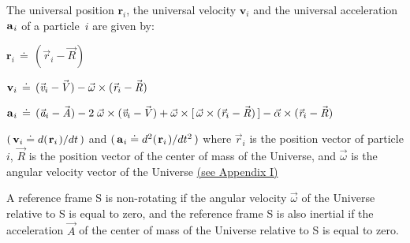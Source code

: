 \documentclass[10pt]{article}
\begin{document}
\par \bigskip \noindent The universal position ${\mathbf{r}}_i$, the universal velocity ${\mathbf{v}}_i$ and the universal acceleration ${\mathbf{a}}_{\hspace{+0.045em}i}$ of a \hbox {particle $i$} are given by:

\par \bigskip\smallskip ${\mathbf{r}}_i \,\doteq\, ({\vec{\mathit{r}}}_i - {\vec{\mathit{R}}})$

\par \bigskip ${\mathbf{v}}_i \,\doteq\, ({\vec{\mathit{v}}}_i - \hspace{-0.120em}{\vec{\mathit{V}}}) - {\vec{\omega}} \times ({\vec{\mathit{r}}}_i - {\vec{\mathit{R}}})$

\par \bigskip ${\mathbf{a}}_{\hspace{+0.045em}i} \,\doteq\, ({\vec{\mathit{a}}}_i - {\vec{\mathit{A}}}) - 2 \; {\vec{\omega}} \times ({\vec{\mathit{v}}}_i - \hspace{-0.120em}{\vec{\mathit{V}}}) + {\vec{\omega}} \times [ \, {\vec{\omega}} \times ({\vec{\mathit{r}}}_i - {\vec{\mathit{R}}}) \, ] - {\vec{\alpha}} \times ({\vec{\mathit{r}}}_i - {\vec{\mathit{R}}})$

\par \bigskip\smallskip \noindent $( \, {\mathbf{v}}_i \doteq d(\hspace{+0.090em}{\mathbf{r}}_i\hspace{+0.090em})/dt \, )$ and $( \, {\mathbf{a}}_{\hspace{+0.045em}i} \doteq d^2(\hspace{+0.090em}{\mathbf{r}}_i\hspace{+0.090em})/dt^2 \, )$ where ${\vec{\mathit{r}}}_i$ is the position vector of particle $i$, ${\vec{\mathit{R}}}$ is the position vector of the center of mass of the Universe, and ${\vec{\omega}}$ is the angular velocity vector of the Universe \hyperlink{p2a1}{(\hspace{+0.120em}see Appendix I\hspace{+0.120em})}

\par \bigskip \noindent A reference frame S is non-rotating if the angular velocity ${\vec{\omega}}$ of the Universe relative to S is equal to zero, and the reference frame S is also inertial if the acceleration ${\vec{\mathit{A}}}$ of the center of mass of the Universe relative to S is equal to zero.

\vspace{+1.20em}
\end{document}
